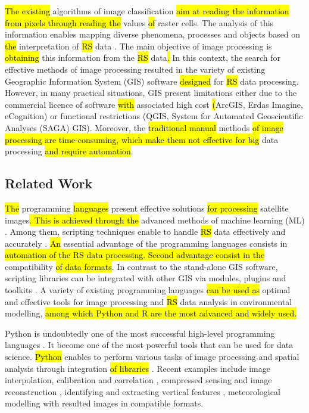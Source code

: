 \documentclass[jimaging,article,submit,pdftex,moreauthors]{Definitions/mdpi}
\begin{document}
\hl{The existing }algorithms of image classification\hl{ aim at reading the information from pixels through reading the }values\hl{ of} raster cells. The analysis of this information enables mapping \hl{ }diverse phenomena, processes and objects based on \hl{the} interpretation of \hl{RS} data \cite{PERIN2021106694,PAHLEVAN2022112860,Lemenkova202141,ABU2021107863,ATTOUMANE2022103285}. The main objective of image processing is \hl{obtaining} this information from the \hl{RS} data\hl{. }In this context, the search for effective methods of image processing resulted in the variety of existing Geographic Information System (GIS) software\hl{ designed }for \hl{RS} data processing. However, in many practical situations, GIS present limitations either due to the commercial licence of software \hl{with} associated high cost \hl{(}ArcGIS, Erdas Imagine, eCognition) or functional restrictions (QGIS, System for Automated Geoscientific Analyses (SAGA) GIS). Moreover, the \hl{traditional manual }methods\hl{ of image processing are time-consuming, which make them not effective for big} data processing \hl{and require automation}. 

\subsection{Related Work}

\hl{The }programming \hl{languages} present\hl{ }effective solutions \hl{for processing} satellite images\hl{. This is achieved through the} advanced methods of machine learning (ML) \cite{MASOLELE2021112600,9066075,MARTINS2022113203,rs71114876}. Among them, scripting techniques enable to handle \hl{RS} data effectively and accurately\hl{ }\cite{6344536,ELLEFSEN20191171,Lemenkova202212,6910592,Lemenkova202215,4160259}. \hl{An }essential advantage of the programming languages consists in \hl{automation of the RS data processing. Second advantage consist in the }compatibility\hl{ of data formats}. In contrast to the stand-alone GIS software, scripting libraries can be integrated with other GIS via modules, plugins and toolkits \cite{6407912,7378577,VOS2019104528}. A variety of existing programming languages \hl{can be used as} optimal and effective tools\hl{ }for image processing and \hl{RS} data analysis in environmental modelling,\hl{ among which Python and R are the most advanced and widely used.}

Python is undoubtedly one of the most successful high-level programming languages \cite{van1995python}. It become one of the most powerful tools that can be used for data science. \hl{Python} enables to perform various tasks of image processing and spatial analysis through integration \hl{of libraries} \cite{1247428,Rey2010PySALAP,Rey2010}. Recent examples include image interpolation, calibration and correlation \cite{DEDEUSFILHO2022101131}, compressed sensing and image reconstruction \cite{FARRENS2020100402}, identifying and extracting vertical features \cite{GAO2022105503}, meteorological modelling \cite{6528254} with resulted images in compatible formats. 
\end{document}
